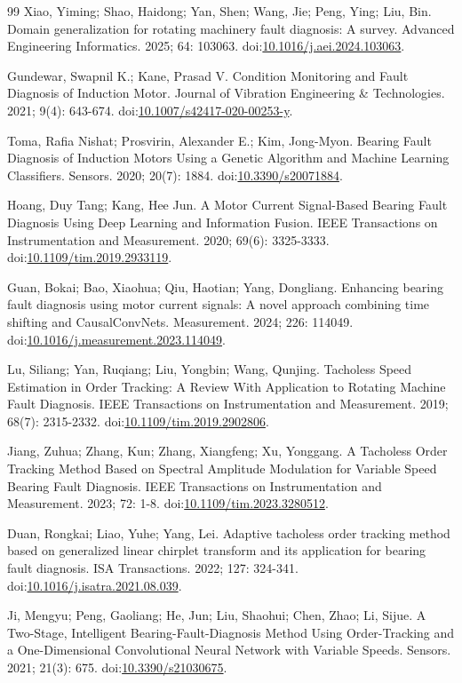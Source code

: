 \documentclass[machines,article,submit,oneauthor]{Definitions/mdpi}
\begin{document}
\begin{thebibliography}{99}
 Xiao, Yiming; Shao, Haidong; Yan, Shen; Wang, Jie; Peng, Ying; Liu, Bin. Domain generalization for rotating machinery fault diagnosis: A survey. Advanced Engineering Informatics. 2025; 64: 103063. doi:\url{10.1016/j.aei.2024.103063}.

 Gundewar, Swapnil K.; Kane, Prasad V. Condition Monitoring and Fault Diagnosis of Induction Motor. Journal of Vibration Engineering \& Technologies. 2021; 9(4): 643-674. doi:\url{10.1007/s42417-020-00253-y}.

 Toma, Rafia Nishat; Prosvirin, Alexander E.; Kim, Jong-Myon. Bearing Fault Diagnosis of Induction Motors Using a Genetic Algorithm and Machine Learning Classifiers. Sensors. 2020; 20(7): 1884. doi:\url{10.3390/s20071884}.

 Hoang, Duy Tang; Kang, Hee Jun. A Motor Current Signal-Based Bearing Fault Diagnosis Using Deep Learning and Information Fusion. IEEE Transactions on Instrumentation and Measurement. 2020; 69(6): 3325-3333. doi:\url{10.1109/tim.2019.2933119}.

 Guan, Bokai; Bao, Xiaohua; Qiu, Haotian; Yang, Dongliang. Enhancing bearing fault diagnosis using motor current signals: A novel approach combining time shifting and CausalConvNets. Measurement. 2024; 226: 114049. doi:\url{10.1016/j.measurement.2023.114049}.

 Lu, Siliang; Yan, Ruqiang; Liu, Yongbin; Wang, Qunjing. Tacholess Speed Estimation in Order Tracking: A Review With Application to Rotating Machine Fault Diagnosis. IEEE Transactions on Instrumentation and Measurement. 2019; 68(7): 2315-2332. doi:\url{10.1109/tim.2019.2902806}.

 Jiang, Zuhua; Zhang, Kun; Zhang, Xiangfeng; Xu, Yonggang. A Tacholess Order Tracking Method Based on Spectral Amplitude Modulation for Variable Speed Bearing Fault Diagnosis. IEEE Transactions on Instrumentation and Measurement. 2023; 72: 1-8. doi:\url{10.1109/tim.2023.3280512}.

 Duan, Rongkai; Liao, Yuhe; Yang, Lei. Adaptive tacholess order tracking method based on generalized linear chirplet transform and its application for bearing fault diagnosis. ISA Transactions. 2022; 127: 324-341. doi:\url{10.1016/j.isatra.2021.08.039}.

 Ji, Mengyu; Peng, Gaoliang; He, Jun; Liu, Shaohui; Chen, Zhao; Li, Sijue. A Two-Stage, Intelligent Bearing-Fault-Diagnosis Method Using Order-Tracking and a One-Dimensional Convolutional Neural Network with Variable Speeds. Sensors. 2021; 21(3): 675. doi:\url{10.3390/s21030675}.


\end{thebibliography}
\end{document}
